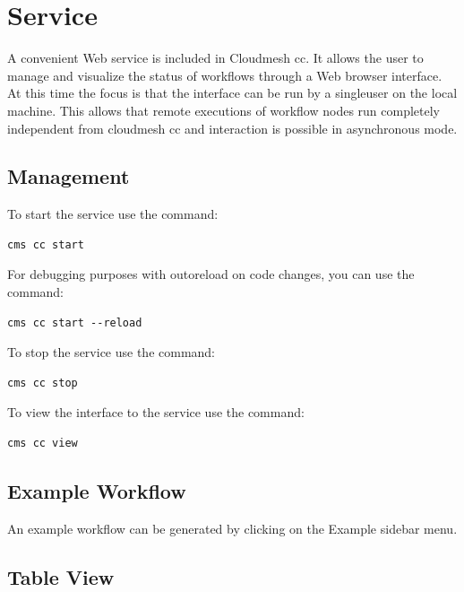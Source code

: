 
\section{Service}\label{service}

A convenient Web service is included in Cloudmesh cc. It allows the user
to manage and visualize the status of workflows through a Web browser
interface. At this time the focus is that the interface can be run by a
singleuser on the local machine. This allows that remote executions of
workflow nodes run completely independent from cloudmesh cc and
interaction is possible in asynchronous mode.

\subsection{Management}\label{management}

To start the service use the command:

\begin{verbatim}
cms cc start
\end{verbatim}

For debugging purposes with outoreload on code changes, you can use the
command:

\begin{verbatim}
cms cc start --reload
\end{verbatim}

To stop the service use the command:

\begin{verbatim}
cms cc stop
\end{verbatim}

To view the interface to the service use the command:

\begin{verbatim}
cms cc view
\end{verbatim}

\subsection{Example Workflow}\label{example-workflow}

An example workflow can be generated by clicking on the Example
sidebar menu.

\subsection{Table View}\label{table-view}

